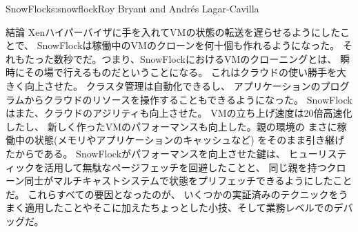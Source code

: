 \begin{aosachapter}{SnowFlock}{s:snowflock}{Roy Bryant and Andr\'e{s} Lagar-Cavilla}
\begin{aosasect1}{結論}
Xenハイパーバイザに手を入れてVMの状態の転送を遅らせるようにしたことで、
SnowFlockは稼働中のVMのクローンを何十個も作れるようになった。
それもたった数秒でだ。つまり、SnowFlockにおけるVMのクローニングとは、
瞬時にその場で行えるものだということになる。
これはクラウドの使い勝手を大きく向上させた。
クラスタ管理は自動化できるし、
アプリケーションのプログラムからクラウドのリソースを操作することもできるようになった。
SnowFlockはまた、クラウドのアジリティも向上させた。
VMの立ち上げ速度は20倍高速化したし、
新しく作ったVMのパフォーマンスも向上した。親の環境の
まさに稼働中の状態(メモリやアプリケーションのキャッシュなど)
をそのまま引き継げたからである。
SnowFlockがパフォーマンスを向上させた鍵は、
ヒューリスティックを活用して無駄なページフェッチを回避したことと、
同じ親を持つクローン同士がマルチキャストシステムで状態をプリフェッチできるようにしたことだ。
これらすべての要因となったのが、
いくつかの実証済みのテクニックをうまく適用したことやそこに加えたちょっとした小技、そして業務レベルでのデバッグだ。


\end{aosasect1}
\end{aosachapter}
